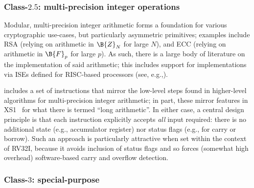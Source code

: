 


\subsubsection{Class-$2.5$: multi-precision integer operations}
\label{sec:bg:feature:2:5}

%
%

Modular, multi-precision integer arithmetic forms a foundation for various
cryptographic use-cases, but particularly asymmetric primitives; examples 
include
RSA (relying on arithmetic in $\B{Z}_N$ for large $N$),
and
ECC (relying on arithmetic in $\B{F}_p$ for large $p$).
As such, there is a large body of literature on the implementation of said 
arithmetic; this includes support for implementations via ISEs defined for 
RISC-based processors
(see, e.g.,\cite{SCARV:GroKam:03,SCARV:GroKam:04}).

\XCID includes a set of instructions that mirror the low-level steps found
in higher-level algorithms for multi-precision integer arithmetic; in part,
these mirror features in XS1~\cite[Section 18]{SCARV:XS1:09} for what there
is termed ``long arithmetic''.  In either case, a central design principle 
is that each instruction explicitly accepts {\em all} input required: there
is no additional state (e.g., accumulator register) nor status flags (e.g., 
for carry or borrow).  Such an approach is particularly attractive when set
within the context of RV32I, because it avoids inclusion of status flags
and so forces (somewhat high overhead) software-based carry and overflow 
detection.


\subsubsection{Class-$3$:   special-purpose}
\label{sec:bg:feature:3}

